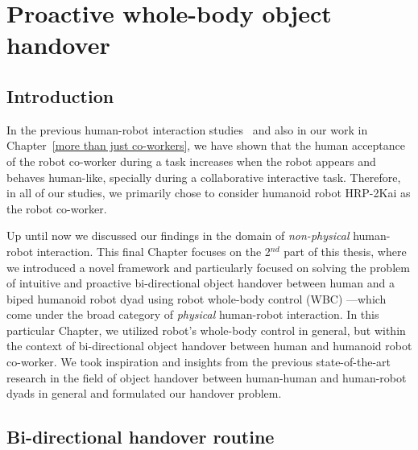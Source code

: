 	
{\color{blue}\chapter{Proactive whole-body object handover}\label{handover chapter}}


\section{Introduction}\label{introduction}


In the previous human-robot interaction studies~\cite{huber2008human, strabala2013toward, shibata1995experimental} and also in our work in Chapter~\ref{more than just co-workers}, we have shown that the human acceptance of the robot co-worker during a task increases when the robot appears and behaves human-like, specially during a collaborative interactive task. Therefore, in all of our studies, we primarily chose to consider humanoid robot HRP-2Kai as the robot co-worker. 

Up until now we discussed our findings in the domain of \textit{non-physical} human-robot interaction. This final Chapter focuses on the 2$^{nd}$ part of this thesis, where we introduced a novel framework and particularly focused on solving the problem of intuitive and proactive bi-directional object handover between human and a biped humanoid robot dyad using robot whole-body control (WBC) ---which come under the broad category of \textit{physical} human-robot interaction. In this particular Chapter, we utilized  robot's whole-body control in general, but within the context of bi-directional object handover between human and humanoid robot co-worker. We took inspiration and insights from the previous state-of-the-art research in the field of object handover between human-human and human-robot dyads in general and formulated our handover problem.


\section{Bi-directional handover routine}\label{handover routine}

